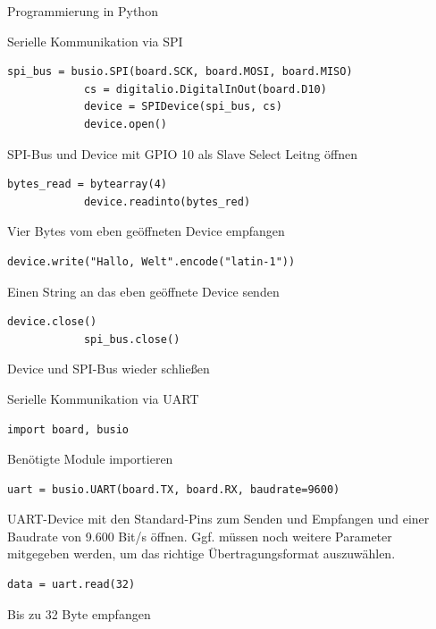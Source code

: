 {\begin{frame}{Programmierung in Python}
\begin{block}{Serielle Kommunikation via SPI}
        \begin{lstlisting}[style=MethodenListeKlein, gobble=12]
            spi_bus = busio.SPI(board.SCK, board.MOSI, board.MISO)
            cs = digitalio.DigitalInOut(board.D10)
            device = SPIDevice(spi_bus, cs)
            device.open()
        \end{lstlisting}
        SPI-Bus und Device mit GPIO 10 als Slave Select Leitng öffnen
        \smallskip

        \begin{lstlisting}[style=MethodenListeKlein, gobble=12]
            bytes_read = bytearray(4)
            device.readinto(bytes_red)
        \end{lstlisting}
        Vier Bytes vom eben geöffneten Device empfangen
        \smallskip

        \begin{lstlisting}[style=MethodenListeKlein, gobble=12]
            device.write("Hallo, Welt".encode("latin-1"))
        \end{lstlisting}
        Einen String an das eben geöffnete Device senden
        \smallskip

        \begin{lstlisting}[style=MethodenListeKlein, gobble=12]
            device.close()
            spi_bus.close()
        \end{lstlisting}
        Device und SPI-Bus wieder schließen
        \smallskip
    \end{block}

    \framebreak

    \begin{block}{Serielle Kommunikation via UART}
        \begin{lstlisting}[style=MethodenListeKlein, gobble=12]
            import board, busio
        \end{lstlisting}
        Benötigte Module importieren
        \smallskip

        \begin{lstlisting}[style=MethodenListeKlein, gobble=12]
            uart = busio.UART(board.TX, board.RX, baudrate=9600)
        \end{lstlisting}
        UART-Device mit den Standard-Pins zum Senden und Empfangen und einer Baudrate von 9.600 Bit/s öffnen.
        Ggf. müssen noch weitere Parameter mitgegeben werden, um das richtige Übertragungsformat auszuwählen.
        \smallskip

        \begin{lstlisting}[style=MethodenListeKlein, gobble=12]
            data = uart.read(32)
        \end{lstlisting}
        Bis zu 32 Byte empfangen
        \smallskip


\end{block}
\end{frame}}
